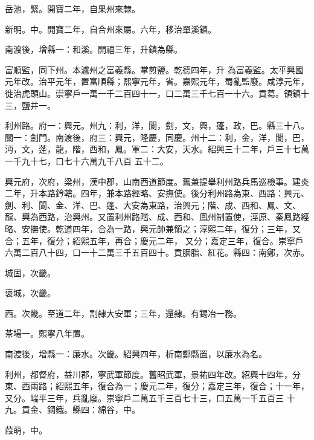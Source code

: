 \begin{pinyinscope}
 岳池，緊。開寶二年，自果州來隸。



 新明。中。開寶二年，自合州來屬。六年，移治單溪鎮。



 南渡後，增縣一：和溪。開禧三年，升鎮為縣。



 富順監，同下州。本瀘州之富義縣。掌煎鹽。乾德四年，升
 為富義監。太平興國元年改。治平元年，置富順縣；熙寧元年，省。嘉熙元年，蜀亂監廢。咸淳元年，徙治虎頭山。崇寧戶一萬一千二百四十一，口二萬三千七百一十六。貢葛。領鎮十三，鹽井一。



 利州路。府一：興元。州九：利，洋，閬，劍，文，興，蓬，政，巴。縣三十八。關一：劍門。南渡後，府三：興元，隆慶，同慶。州十二：利，金，洋，閬，巴，沔，文，蓬，龍，階，西和，鳳。軍二：大安，天水。紹興三十二年，戶三十七萬一千九十七，口七十六萬九千八百
 五十二。



 興元府，次府，梁州，漢中郡，山南西道節度。舊兼提舉利州路兵馬巡檢事。建炎二年，升本路鈐轄。四年，兼本路經略、安撫使。後分利州路為東、西路：興元、劍、利、閬、金、洋、巴、蓬、大安為東路，治興元；階、成、西和、鳳、文、龍、興為西路，治興州。又置利州路階、成、西和、鳳州制置使，涇原、秦鳳路經略、安撫使。乾道四年，合為一路，興元帥兼領之；淳熙二年，復分；三年，又合；五年，復分；紹熙五年，再合；慶元二年，
 又分；嘉定三年，復合。崇寧戶六萬二百八十四，口一十二萬三千五百四十。貢胭脂、紅花。縣四：南鄭，次赤。



 城固，次畿。



 褒城，次畿。



 西。次畿。至道二年，割隸大安軍；三年，還隸。有錫冶一務。



 茶場一。熙寧八年置。



 南渡後，增縣一：廉水。次畿。紹興四年，析南鄭縣置，以廉水為名。



 利州，都督府，益川郡，寧武軍節度。舊昭武軍，景祐四年改。紹興十四年，分東、西兩路；紹熙五年，復合為一；慶元二年，復分；嘉定三年，復合；十一年，又分。端平三年，兵亂廢。崇寧戶二萬五千三百七十三，口五萬一千五百三
 十九。貢金、鋼鐵。縣四：綿谷，中。



 葭萌，中。




\end{pinyinscope}
